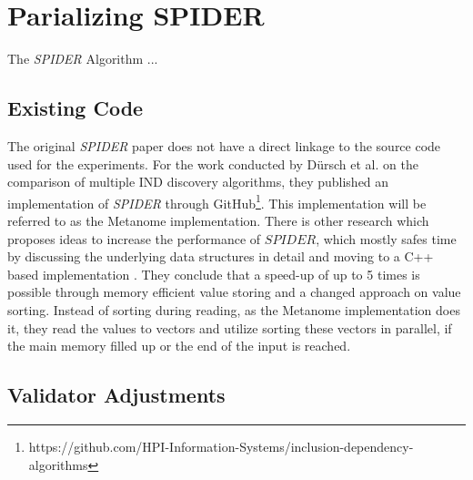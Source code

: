 \section{Parializing SPIDER}
The \textit{SPIDER} Algorithm \cite{bauckmann2006efficiently} ...

\subsection{Existing Code}

The original \textit{SPIDER} paper does not have a direct linkage to the source code used for the experiments. For the work conducted by Dürsch et al. on the comparison of multiple IND discovery algorithms\cite{dursch2019inclusion}, they published an implementation of \textit{SPIDER} through GitHub\footnote{https://github.com/HPI-Information-Systems/inclusion-dependency-algorithms}. This implementation will be referred to as the Metanome implementation. There is other research which proposes ideas to increase the performance of $SPIDER$, which mostly safes time by discussing the underlying data structures in detail and moving to a C++ based implementation \cite{smirnov2023fast}. They conclude that a speed-up of up to 5 times is possible through memory efficient value storing and a changed approach on value sorting. Instead of sorting during reading, as the Metanome implementation does it, they read the values to vectors and utilize sorting these vectors in parallel, if the main memory filled up or the end of the input is reached.

\subsection{Validator Adjustments}


